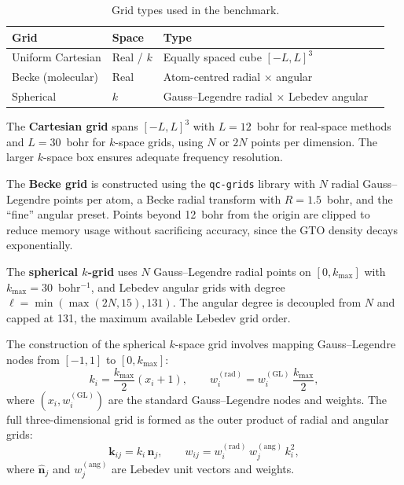 \documentclass[12pt,a4paper]{article}
\begin{document}
\begin{table}[H]
\centering
\caption{Grid types used in the benchmark.}
\label{tab:grids}
\begin{tabular}{@{}llll@{}}
\toprule
\textbf{Grid}             & \textbf{Space}    & \textbf{Type}                                \\
\midrule
Uniform Cartesian         & Real / $k$        & Equally spaced cube $[-L,L]^3$               \\
Becke (molecular)         & Real              & Atom-centred radial $\times$ angular          \\
Spherical                 & $k$               & Gauss--Legendre radial $\times$ Lebedev angular \\
\bottomrule
\end{tabular}
\end{table}

The \textbf{Cartesian grid} spans $[-L,L]^3$ with $L = 12$~bohr for real-space methods and $L = 30$~bohr for $k$-space grids, using $N$ or $2N$ points per dimension. The larger $k$-space box ensures adequate frequency resolution.

The \textbf{Becke grid} is constructed using the \texttt{qc-grids} library with $N$ radial Gauss--Legendre points per atom, a Becke radial transform with $R = 1.5$~bohr, and the ``fine'' angular preset. Points beyond 12~bohr from the origin are clipped to reduce memory usage without sacrificing accuracy, since the GTO density decays exponentially.

The \textbf{spherical $k$-grid} uses $N$ Gauss--Legendre radial points on $[0, k_{\max}]$ with $k_{\max} = 30$~bohr$^{-1}$, and Lebedev angular grids with degree $\ell = \min(\max(2N, 15), 131)$. The angular degree is decoupled from $N$ and capped at 131, the maximum available Lebedev grid order.

The construction of the spherical $k$-space grid involves mapping Gauss--Legendre nodes from $[-1,1]$ to $[0, k_{\max}]$:
\begin{equation}
 k_i = \frac{k_{\max}}{2}(x_i + 1), \qquad w_i^{(\text{rad})} = w_i^{(\text{GL})}\,\frac{k_{\max}}{2},
    \label{eq:kgrid_map}
\end{equation}
where $(x_i, w_i^{(\text{GL})})$ are the standard Gauss--Legendre nodes and weights. The full three-dimensional grid is formed as the outer product of radial and angular grids:
\begin{equation}
 \mathbf{k}_{ij} = k_i\,\hat{\mathbf{n}}_j, \qquad w_{ij} = w_i^{(\text{rad})}\,w_j^{(\text{ang})}\,k_i^2,
    \label{eq:kgrid_3d}
\end{equation}
where $\hat{\mathbf{n}}_j$ and $w_j^{(\text{ang})}$ are Lebedev unit vectors and weights.
\end{document}
